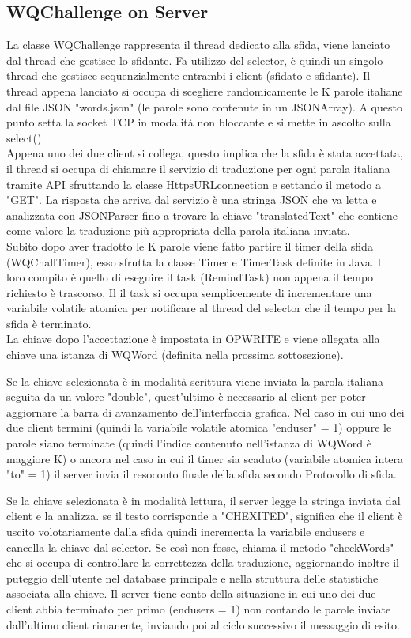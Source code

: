 \documentclass{article}
\begin{document}
\subsection{WQChallenge on Server}
La classe WQChallenge rappresenta il thread dedicato alla sfida, viene lanciato dal thread che gestisce lo sfidante. Fa utilizzo del selector, è quindi un singolo thread che gestisce sequenzialmente entrambi i client (sfidato e sfidante). Il thread appena lanciato si occupa di scegliere randomicamente le K parole italiane dal file JSON "words.json" (le parole sono contenute in un JSONArray). A questo punto setta la socket TCP in modalità non bloccante e si mette in ascolto sulla select(). \\
Appena uno dei due client si collega, questo implica che la sfida è stata accettata, il thread si occupa di chiamare il servizio di traduzione per ogni parola italiana tramite API sfruttando la classe HttpsURLconnection e settando il metodo a "GET". La risposta che arriva dal servizio è una stringa JSON che va letta e analizzata con JSONParser fino a trovare la chiave "translatedText" che contiene come valore la traduzione più appropriata della parola italiana inviata. \\
Subito dopo aver tradotto le K parole viene fatto partire il timer della sfida (WQChallTimer), esso sfrutta la classe Timer e TimerTask definite in Java. Il loro compito è quello di eseguire il task (RemindTask) non appena il tempo richiesto è trascorso. Il il task si occupa semplicemente di incrementare una variabile volatile atomica per notificare al thread del selector che il tempo per la sfida è terminato.
\\
La chiave dopo l'accettazione è impostata in OP\textunderscore WRITE e viene allegata alla chiave una istanza di WQWord (definita nella prossima sottosezione). 

Se la chiave selezionata è in modalità scrittura viene inviata la parola italiana seguita da un valore "double", quest'ultimo è necessario al client per poter aggiornare la barra di avanzamento dell'interfaccia grafica.
Nel caso in cui uno dei due client termini (quindi la variabile volatile atomica "enduser" = 1) oppure le parole siano terminate (quindi l'indice contenuto nell'istanza di WQWord è maggiore K) o ancora nel caso in cui il timer sia scaduto (variabile atomica intera "to" = 1) il server invia il resoconto finale della sfida secondo Protocollo di sfida.

Se la chiave selezionata è in modalità lettura, il server legge la stringa inviata dal client e la analizza. se il testo corrisponde a "CHEXITED", significa che il client è uscito volotariamente dalla sfida quindi incrementa la variabile endusers e cancella la chiave dal selector. Se così non fosse, chiama il metodo "checkWords" che si occupa di controllare la correttezza della traduzione, aggiornando inoltre il puteggio dell'utente nel database principale e nella struttura delle statistiche associata alla chiave. Il server tiene conto della situazione in cui uno dei due client abbia terminato per primo (endusers = 1) non contando le parole inviate dall'ultimo client rimanente, inviando poi al ciclo successivo il messaggio di esito.
\end{document}
